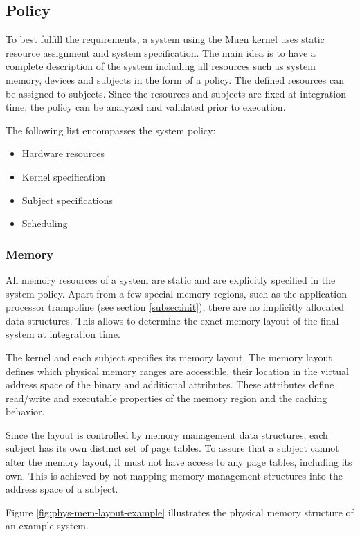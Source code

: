 \subsection{Policy}\label{subsec:policy}
To best fulfill the requirements, a system using the Muen kernel uses static
resource assignment and system specification. The main idea is to have a
complete description of the system including all resources such as system
memory, devices and subjects in the form of a policy. The defined resources can
be assigned to subjects. Since the resources and subjects are fixed at
integration time, the policy can be analyzed and validated prior to execution.

The following list encompasses the system policy:
\begin{itemize}
	\item Hardware resources
	\item Kernel specification
	\item Subject specifications
	\item Scheduling
\end{itemize}

\subsubsection{Memory}
All memory resources of a system are static and are explicitly specified in the
system policy. Apart from a few special memory regions, such as the application
processor trampoline (see section \ref{subsec:init}), there are no implicitly
allocated data structures. This allows to determine the exact memory layout of
the final system at integration time.

The kernel and each subject specifies its memory layout. The memory layout
defines which physical memory ranges are accessible, their location in the
virtual address space of the binary and additional attributes. These attributes
define read/write and executable properties of the memory region and the caching
behavior.

Since the layout is controlled by memory management data structures,
each subject has its own distinct set of page tables. To assure that a subject
cannot alter the memory layout, it must not have access to any page tables,
including its own. This is achieved by not mapping memory management structures
into the address space of a subject.

Figure \ref{fig:phys-mem-layout-example} illustrates the physical memory
structure of an example system.

